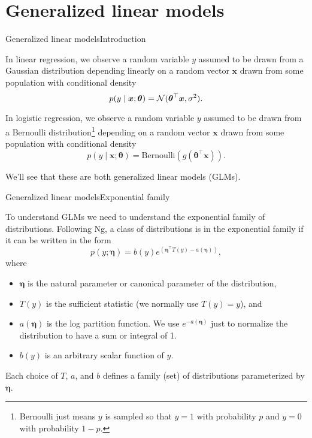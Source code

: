 \documentclass{beamer}
\renewcommand{\vec}[1]{\boldsymbol{#1}}
\begin{document}
\section{Generalized linear models}

\begin{frame}{Generalized linear models}{Introduction}

  In \alert{linear regression}, we observe a random variable $y$
  assumed to be drawn from a Gaussian distribution depending linearly
  on a random vector $\vec{x}$ drawn from some population with
  conditional density
  \[ p(y \mid \vec{x} ; \vec{\theta}) = {\cal N}(\vec{\theta}^\top \vec{x}, \sigma^2) .\]

  \medskip

  In \alert{logistic regression}, we observe a random variable $y$
  assumed to be drawn from a Bernoulli distribution\footnote{Bernoulli
    just means $y$ is sampled so that $y=1$ with probability $p$ and
    $y=0$ with probability $1-p$.} depending on a random vector $\vec{x}$
  drawn from some population with conditional density
  \[ p(y \mid \vec{x} ; \vec{\theta}) = \textrm{Bernoulli}(g(\vec{\theta}^\top \vec{x})) .\]

  \medskip

  We'll see that these are both \alert{generalized linear models} (GLMs).

\end{frame}


\begin{frame}{Generalized linear models}{Exponential family}

  To understand GLMs we need to understand the \alert{exponential
    family} of distributions. Following Ng, a class of distributions
  is in the exponential family if it can be written in the form
  \[ p(y ; \vec{\eta}) = b(y) e^{(\vec{\eta}^\top T(y)-a(\vec{\eta}))},\]
  where
  \begin{itemize}
  \item $\vec{\eta}$ is the \alert{natural parameter} or
    \alert{canonical parameter} of the distribution,
  \item $T(y)$ is the \alert{sufficient statistic} (we normally use
    $T(y)=y$), and
  \item $a(\vec{\eta})$ is the \alert{log partition function}. We use
    $e^{-a(\vec{\eta})}$ just to normalize the distribution to have a
    sum or integral of 1.
  \item $b(y)$ is an arbitrary scalar function of $y$.
  \end{itemize}

  \medskip

  Each choice of $T$, $a$, and $b$ defines a \alert{family} (set) of
  distributions parameterized by $\vec{\eta}$.
 
\end{frame}
\end{document}
